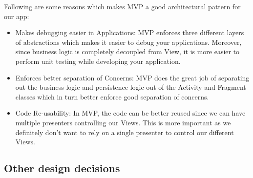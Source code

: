 Following are some reasons which makes MVP a good architectural pattern for our app:
\begin{itemize}
\item Makes debugging easier in Applications: MVP enforces three different layers of abstractions which makes it easier to debug your applications. Moreover, since business logic is completely decoupled from View, it is more easier to perform unit testing while developing your application.
\item Enforces better separation of Concerns: MVP does the great job of separating out the business logic and persistence logic out of the Activity and Fragment classes which in turn better enforce good separation of concerns.

\item Code Re-usability: In MVP, the code can be better reused since we can have multiple presenters controlling our Views. This is more important as we definitely don’t want to rely on a single presenter to control our different Views.
\end{itemize}


\subsection{Other design decisions}

